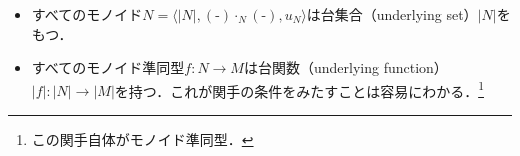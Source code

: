 \documentclass[dvipdfmx,a4j,10pt]{jsarticle}
\theoremstyle{mystyle1}
\theoremstyle{mystyle2}
\newcommand{\blueunderline}[3][pos=0.5]{
    \tcboxmath[
        enhanced,
        frame hidden, %
        interior hidden, %
        size=minimal, %
        overlay={
                \draw[
                    blue,
                    decorate
                ] ([yshift=-4pt]frame.south west) -- ([yshift=-4pt]frame.south east)
                node[#1,scale=0.8,below] {#3};
            }
    ]{#2}
}
\newcommand{\Sets}{\mathbf{Sets}}
\newcommand{\Mon}{\mathbf{Mon}}
\begin{document}
\begin{itemize}
	      \begin{enumerate}
		      \item $M$のすべての元$m$は，有限個（0個も含む）の$A$の元の積$(\textrm{-})\cdot_M(\textrm{-})$をとることにより
		            \[
			            m=a_1\cdot_M a_2\cdot_M\cdots\cdot_M a_m\quad(1\leq i\leq m,a_i\in A)
		            \]
		            （0個の場合は$m=u_M$）と表せる\footnote{結合律と単位元律から．}．
		      \item $M$の元の間に非自明な（=モノイド構造の条件\footnote{結合律と単位元律のこと．}から導かれる以外の）関係はない．言い換えると
		            \[
			            M\ni \blueunderline[pos=1.0]{a_1\cdot_M a_2\cdot_M\cdots\cdot_M a_j}{$=m$} = \blueunderline[pos=1.0]{a_1'\cdot_Ma_2'\cdot_M\cdots\cdot_M a_k'}{$=m'$}\quad(a_i,a_i'\in A)
		            \]
		            は結合律と単位元律のみから導かれる．\footnote{これ以外の意味で$m=m'$となることはない（noiseの$m=m'$はない）．ユニバーサル代数に由来する．}
	      \end{enumerate}
	      条件(1)を"no junk"\footnote{具体的な構成法でつくられるもの以外は要素に入っていない（それ以外のjunkはない）．}，条件(2)を"no noise"\footnote{noiseによって等しくなっている（非自明な等しさが入っている）ことはない．}とよぶこともある\footnote{歴史的な経緯でこのように言われる．}\footnote{例えば，$A=\{a\}$のとき$\{\varepsilon,a,aa\}$はモノイド構造を持つが，$aaa=\varepsilon$という等式が入っているものであれば，この等号は結合律と単位元律からは導かれないので，これは自由生成ではない．}．
	\item すべてのモノイド$N=\langle|N|,(\textrm{-})\cdot_N(\textrm{-}),u_N\rangle$は台集合（underlying set）$|N|$をもつ．
	\item すべてのモノイド準同型$f:N\to M$は台関数（underlying function）$|f|:|N|\to|M|$を持つ．これが関手の条件をみたすことは容易にわかる．\footnote{
		      この関手自体がモノイド準同型．


}
\end{itemize}
\end{document}
